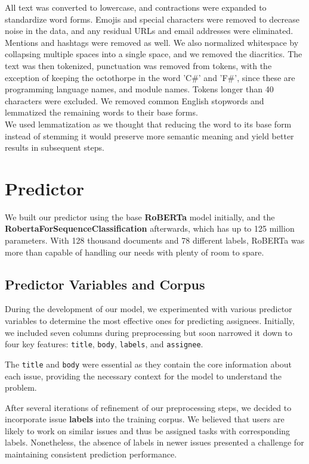\documentclass[tikz,10pt,fleqn]{article}
\begin{document}
All text was converted to lowercase, and contractions were expanded to standardize word forms. Emojis and special characters were removed to decrease noise in the data, and any residual URLs and email addresses were eliminated. Mentions and hashtags were removed as well. We also normalized whitespace by collapsing multiple spaces into a single space, and we removed the diacritics.
The text was then tokenized, punctuation was removed from tokens, with the exception of keeping the octothorpe in the word 'C\#' and 'F\#', since these are programming language names, and module names. Tokens longer than 40 characters were excluded. We removed common English stopwords and lemmatized the remaining words to their base forms.\\
We used lemmatization as we thought that reducing the word to its base form instead of stemming it would preserve more semantic meaning and yield better results in subsequent steps.


\section*{Predictor} We built our predictor using the base \textbf{RoBERTa} model initially, and the \textbf{RobertaForSequenceClassification} afterwards, which has up to 125 million parameters. With 128 thousand documents and 78 different labels, RoBERTa was more than capable of handling our needs with plenty of room to spare.

\subsection*{Predictor Variables and Corpus} During the development of our model, we experimented with various predictor variables to determine the most effective ones for predicting assignees. Initially, we included seven columns during preprocessing but soon narrowed it down to four key features: \texttt{title}, \texttt{body}, \texttt{labels}, and \texttt{assignee}.

The \texttt{title} and \texttt{body} were essential as they contain the core information about each issue, providing the necessary context for the model to understand the problem.

After several iterations of refinement  of our preprocessing steps, we decided to incorporate issue \textbf{labels} into the training corpus. We believed that users are likely to work on similar issues and thus be assigned tasks with corresponding labels. Nonetheless, the absence of labels in newer issues presented a challenge for maintaining consistent prediction performance.
\end{document}
